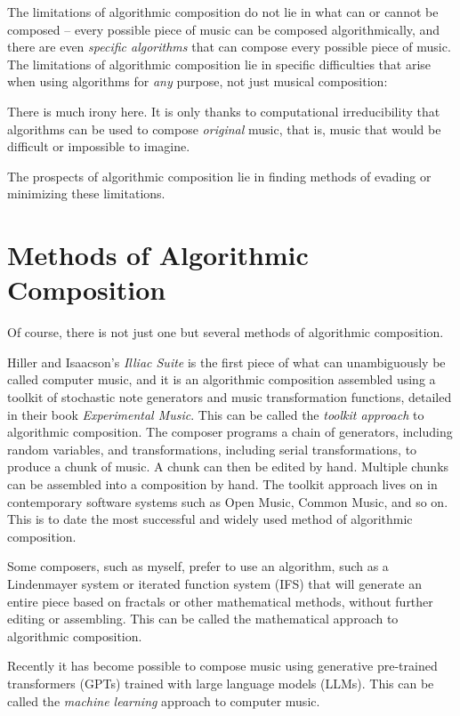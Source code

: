 \documentclass[11pt]{amsart}
\begin{document}
The limitations of algorithmic composition do not lie in what can or cannot be composed -- every possible piece of music can be composed algorithmically, and there are even \emph{specific algorithms} that can compose every possible piece of music. The limitations of algorithmic composition lie in specific difficulties that arise when using algorithms for \emph{any} purpose, not just musical composition:

There is much irony here. It is only thanks to computational irreducibility that algorithms can be used to compose \emph{original} music, that is, music that would be difficult or impossible to imagine.

The prospects of algorithmic composition lie in finding methods of evading or minimizing these limitations.

\section{Methods of Algorithmic Composition}

Of course, there is not just one but several methods of algorithmic composition.

Hiller and Isaacson's \emph{Illiac Suite} is the first piece of what can unambiguously be called computer music, and it is an algorithmic composition assembled using a toolkit of stochastic note generators and music transformation functions, detailed in their book \emph{Experimental Music}. This can be called the \emph{toolkit approach} to algorithmic composition. The composer programs a chain of generators, including random variables, and transformations, including serial transformations, to produce a chunk of music. A chunk can then be edited by hand. Multiple chunks can be assembled into a composition by hand. The toolkit approach lives on in contemporary software systems such as Open Music, Common Music, and so on. This is to date the most successful and widely used method of algorithmic composition.

Some composers, such as myself, prefer to use an algorithm, such as a Lindenmayer system or iterated function system (IFS) that will generate an entire piece based on fractals or other mathematical methods, without further editing or assembling. This can be called the {mathematical approach} to algorithmic composition.

Recently it has become possible to compose music using generative pre-trained transformers (GPTs) trained with large language models (LLMs). This can be called the \emph{machine learning} approach to computer music.
\end{document}
